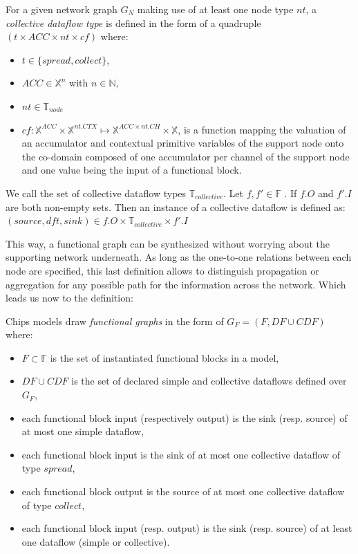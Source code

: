 \documentclass[runningheads]{llncs}
\newcommand{\F}{\mathbb{F}}
\begin{document}
\begin{definition}\label{def:CollectiveDataflows}
    For a given network graph $G_N$ making use of at least one node type $nt$, a \emph{collective dataflow type} is defined in the form of a quadruple $\left(t \times ACC \times nt \times cf\right)$ where:
    \begin{itemize}
        \item $t \in \{spread, collect\}$,
        \item $ACC \in \mathbb{X}^n$ with $n\in\mathbb{N}$,
        \item $nt \in \mathbb{T}_{node}$
        \item $cf : \mathbb{X}^{ACC} \times \mathbb{X}^{nt.CTX} \mapsto \mathbb{X}^{ACC\times nt.CH}\times \mathbb{X}$, is a function mapping the valuation of an accumulator and contextual primitive variables of the support node onto the co-domain composed of one accumulator per channel of the support node and one value being the input of a functional block.
    \end{itemize}
    We call the set of collective dataflow types $\mathbb{T}_{collective}$.
    Let $f,f' \in \F$ . If $f.O$ and $f'.I$ are both non-empty sets. Then an instance of a collective dataflow is defined as:\\
    $(source, dft, sink) \in f.O \times \mathbb{T}_{collective} \times f'.I$
\end{definition}

This way, a functional graph can be synthesized without worrying about the supporting network underneath. As long as the one-to-one relations between each node are specified, this last definition allows to distinguish propagation or aggregation for any possible path for the information across the network. Which leads us now to the definition:

\begin{definition}\label{def:FunctionalGraph}
    Chips models draw \emph{functional graphs} in the form of $G_F = (F, DF\cup CDF)$ where:
    \begin{itemize}
        \item $F \subset \F$ is the set of instantiated functional blocks in a model,
        \item $DF \cup CDF$ is the set of declared simple and collective dataflows defined over $G_F$,
        \item each functional block input (respectively output) is the sink (resp. source) of at most one simple dataflow,
        \item each functional block input is the sink of at most one collective dataflow of type $spread$,
        \item each functional block output is the source of at most one collective dataflow of type $collect$,
        \item each functional block input (resp. output) is the sink (resp. source) of at least one dataflow (simple or collective).
    \end{itemize}
\end{definition}
\end{document}
